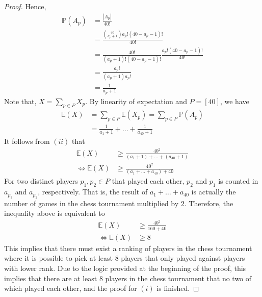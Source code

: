 \begin{proof}
  Hence,
  \begin{align*}
    \mathbb{P}(A_{p}) &= \frac{|A_{p}|}{40!} \\
                      &= \frac{\binom{40}{a_{p} + 1} a_{p}! (40 - a_{p} - 1)!}{40!} \\
                      &= \frac{40!}{(a_{p} + 1)! (40 - a_{p} - 1)!} \frac{a_{p}! (40 - a_{p} - 1)!}{40!} \\
                      &= \frac{a_{p}!}{(a_{p} + 1) a_{p}!} \\
                      &= \frac{1}{a_{p} + 1}
  \end{align*}
  Note that, $X = \sum_{p \in P} X_{p}$. By linearity of expectation and $P = [40]$, we have
  \begin{align*}
    \mathbb{E}(X) &= \sum_{p \in P} \mathbb{E}(X_{p}) = \sum_{p \in P} \mathbb{P}(A_{p}) \\
                  &= \frac{1}{a_{1} + 1} + \ldots + \frac{1}{a_{40} + 1}
  \end{align*}
  It follows from $(ii)$ that
  \begin{align*}
    \mathbb{E}(X) &\geq \frac{40^{2}}{(a_{1} + 1) + \ldots + (a_{40} + 1)} \\
    \Leftrightarrow \mathbb{E}(X) &\geq \frac{40^{2}}{(a_{1} + \ldots + a_{40}) + 40}
  \end{align*}
  For two distinct players $p_{1}, p_{2} \in P$ that played each other, $p_{2}$ and $p_{1}$ is counted in $a_{p_{1}}$ and $a_{p_{2}}$, respectively. That is, the result of $a_{1} + \ldots + a_{40}$ is actually the number of games in the chess tournament multiplied by $2$. Therefore, the inequality above is equivalent to
  \begin{align*}
    \mathbb{E}(X) &\geq \frac{40^{2}}{160 + 40} \\
    \Leftrightarrow \mathbb{E}(X) &\geq 8
  \end{align*}
  This implies that there must exist a ranking of players in the chess tournament where it is possible to pick at least $8$ players that only played against players with lower rank. Due to the logic provided at the beginning of the proof, this implies that there are at least $8$ players in the chess tournament that no two of which played each other, and the proof for $(i)$ is finished.


\end{proof}

